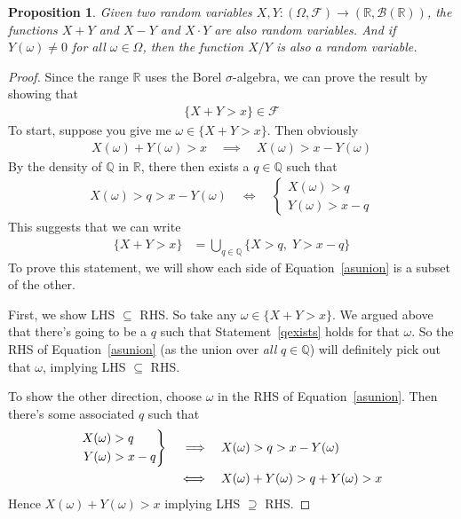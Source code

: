 \documentclass[12pt]{article}
\theoremstyle{plain}
\newtheorem{prop}[thm]{Proposition}
\theoremstyle{definition}
\theoremstyle{remark}
\newcommand{\ra}{\rightarrow}
\newcommand{\sF}{\mathscr{F}}
\newcommand{\sB}{\mathscr{B}}
\newcommand{\Q}{\mathbb{Q}}
\newcommand{\R}{\mathbb{R}}
\newenvironment{rcases}
  {\left.\begin{aligned}}
  {\end{aligned}\right\rbrace}
\begin{document}
\begin{prop}
Given two random variables $X,Y:(\Omega,\sF)\ra (\R,\sB(\R))$, the
functions $X+Y$ and $X-Y$ and $X\cdot Y$ are also random variables.  And
if $Y(\omega)\neq 0$ for all $\omega\in\Omega$, then the function $X/Y$
is also a random variable.
\end{prop}
\begin{proof}
Since the range $\R$ uses the Borel $\sigma$-algebra, we can prove the
result by showing that
\begin{align*}
  \{X+Y> x\} \in\sF
\end{align*}
To start, suppose you give me $\omega\in \{X+Y>x\}$. Then obviously
\begin{align*}
  X(\omega) + Y(\omega) > x
  \quad\implies\quad
  X(\omega) > x  - Y(\omega)
\end{align*}
By the density of $\Q$ in $\R$, there then exists a $q\in \Q$ such that
\begin{align}
  X(\omega) > q > x  - Y(\omega)
  \quad\iff\quad
  \begin{cases}
    X(\omega) > q \\
     Y(\omega) > x  - q
  \end{cases}
  \label{qexists}
\end{align}
This suggests that we can write
\begin{align}
  \{X+Y> x\}
  &=
  \bigcup_{q\in \Q}
  \{
    X > q,\;
    Y > x-q
  \}
  \label{asunion}
\end{align}
To prove this statement, we will show each side of
Equation~\ref{asunion} is a subset of the other.

First, we show LHS $\subseteq$ RHS. So take any $\omega\in \{X+Y>x\}$.
We argued above that there's going to be a $q$ such that
Statement~\ref{qexists} holds for that $\omega$. So the RHS of
Equation~\ref{asunion} (as the union over \emph{all} $q\in\Q$) will
definitely pick out that $\omega$, implying LHS $\subseteq$ RHS.

To show the other direction, choose $\omega$ in the RHS of
Equation~\ref{asunion}. Then there's some associated $q$ such that
\begin{align*}
  \begin{rcases}
  X(\omega) &> q \\
  Y(\omega) &> x-q
  \end{rcases}
  \quad\implies\quad&
  X(\omega) > q > x-Y(\omega) \\
  \quad\iff\quad&
  X(\omega) + Y(\omega) > q + Y(\omega)> x
\end{align*}
Hence $X(\omega)+Y(\omega) > x$ implying LHS $\supseteq$ RHS.


\end{proof}
\end{document}
